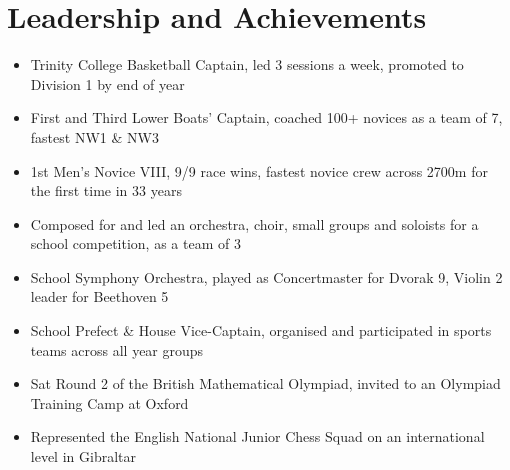 \documentclass[letterpaper, 10pt]{article}
\begin{document}
\section*{Leadership and Achievements}
\vspace{-\baselineskip}
\begin{multicols}{2}
\begin{itemize}
    \itemsep-.2em
	\item Trinity College Basketball Captain, led 3 sessions a week, promoted to Division 1 by end of year%
	\item First and Third Lower Boats' Captain, coached 100+ novices as a team of 7, fastest NW1 \& NW3%
    \item 1st Men's Novice VIII, 9/9 race wins, fastest novice crew across 2700m for the first time in 33 years%
	\item Composed for and led an orchestra, choir, small groups and soloists for a school competition, as a team of 3%
    \vspace{-\baselineskip}
    \vfill\null\columnbreak
    \item School Symphony Orchestra, played as Concertmaster for Dvorak 9, Violin 2 leader for Beethoven 5%
    \item School Prefect \& House Vice-Captain, organised and participated in sports teams across all year groups%
	\item Sat Round 2 of the British Mathematical Olympiad, invited to an Olympiad Training Camp at Oxford%
	\item Represented the English National Junior Chess Squad on an international level in Gibraltar %
	\vspace{-\baselineskip}
\end{itemize}
\end{multicols}
\end{document}

